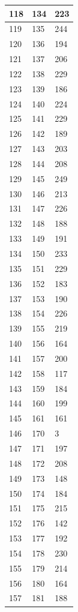 \begin{tabular}{p{}p{}p{}}
\hline
118 & 134 & 223 \\
\hline
119 & 135 & 244 \\
\hline
120 & 136 & 194 \\
\hline
121 & 137 & 206 \\
\hline
122 & 138 & 229 \\
\hline
123 & 139 & 186 \\
\hline
124 & 140 & 224 \\
\hline
125 & 141 & 229 \\
\hline
126 & 142 & 189 \\
\hline
127 & 143 & 203 \\
\hline
128 & 144 & 208 \\
\hline
129 & 145 & 249 \\
\hline
130 & 146 & 213 \\
\hline
131 & 147 & 226 \\
\hline
132 & 148 & 188 \\
\hline
133 & 149 & 191 \\
\hline
134 & 150 & 233 \\
\hline
135 & 151 & 229 \\
\hline
136 & 152 & 183 \\
\hline
137 & 153 & 190 \\
\hline
138 & 154 & 226 \\
\hline
139 & 155 & 219 \\
\hline
140 & 156 & 164 \\
\hline
141 & 157 & 200 \\
\hline
142 & 158 & 117 \\
\hline
143 & 159 & 184 \\
\hline
144 & 160 & 199 \\
\hline
145 & 161 & 161 \\
\hline
146 & 170 & 3 \\
\hline
147 & 171 & 197 \\
\hline
148 & 172 & 208 \\
\hline
149 & 173 & 148 \\
\hline
150 & 174 & 184 \\
\hline
151 & 175 & 215 \\
\hline
152 & 176 & 142 \\
\hline
153 & 177 & 192 \\
\hline
154 & 178 & 230 \\
\hline
155 & 179 & 214 \\
\hline
156 & 180 & 164 \\
\hline
157 & 181 & 188 \\

\end{tabular}
